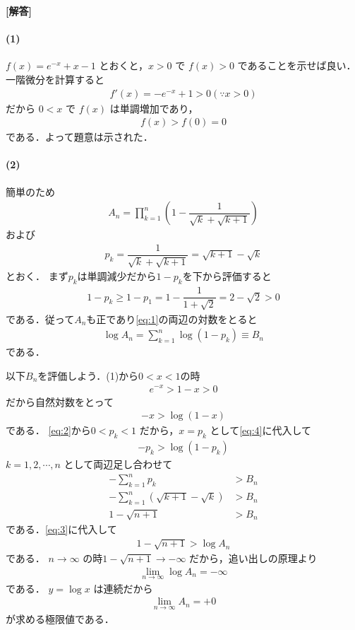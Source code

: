 \documentclass[../../main.tex]{subfiles}
\begin{document}
\begin{oframed}
  
\end{oframed}

{\bf [解答]}
\paragraph{(1)}
$f(x)=e^{-x}+x-1$ とおくと，$x>0$ で $f(x)>0$ であることを示せば良い．
一階微分を計算すると
\begin{align}
  f'(x)=-e^{-x}+1>0 (\because x>0)
\end{align}
だから $0<x$ で $f(x)$ は単調増加であり，
\begin{align}
  f(x)>f(0)=0
\end{align}
である．よって題意は示された．

\paragraph{(2)}
簡単のため
\begin{align}
  A_n = \displaystyle\prod_{k=1}^n\left(1-\dfrac{1}{\sqrt{k}+\sqrt{k+1}}\right) \label{eq:1}
\end{align}
および
\begin{align}
  p_k=\dfrac{1}{\sqrt{k}+\sqrt{k+1}} = \sqrt{k+1}-\sqrt{k}
\end{align}
とおく．
まず$p_k$は単調減少だから$1-p_k$を下から評価すると
\begin{align}
  1-p_k \ge 1-p_1 = 1-\dfrac{1}{1+\sqrt{2}} = 2-\sqrt{2} > 0 \label{eq:2}
\end{align}
である．従って$A_n$も正であり\cref{eq:1}の両辺の対数をとると
\begin{align}
  \log A_n = \sum_{k=1}^n \log(1-p_k) \equiv B_n \label{eq:3}
\end{align}
である．

以下$B_n$を評価しよう．(1)から$0<x<1$の時
\begin{align}
  e^{-x} > 1-x > 0
\end{align}
だから自然対数をとって
\begin{align}
  -x > \log(1-x) \label{eq:4}
\end{align}
である．
\cref{eq:2}から$0<p_k<1$ だから，$x=p_k$ として\cref{eq:4}に代入して
\begin{align}
  -p_k > \log(1-p_k)
\end{align}
$k=1,2,\cdots,n$ として両辺足し合わせて
\begin{align}
  -\sum_{k=1}^n p_k &> B_n \\
  -\sum_{k=1}^n \left(\sqrt{k+1}-\sqrt{k}\right) &> B_n \\
  1-\sqrt{n+1} &> B_n
\end{align}
である．\cref{eq:3}に代入して
\begin{align}
  1-\sqrt{n+1} > \log A_n
\end{align}
である．
$n\to\infty$ の時$1-\sqrt{n+1}\to-\infty$ だから，追い出しの原理より
\begin{align}
  \lim_{n\to\infty} \log A_n = -\infty
\end{align}
である．
$y=\log x$ は連続だから
\begin{align}
  \lim_{n\to\infty} A_n = +0
\end{align}
が求める極限値である．

\newpage
\end{document}
